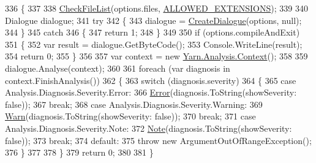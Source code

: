 \begin{DoxyCode}
336         \{
337 
338             \hyperlink{a00185_ad77564b25725a771f0fd4da430582e6f}{CheckFileList}(options.files, \hyperlink{a00185_a0979de7ea02c8c0375b8220a12e6575e}{ALLOWED\_EXTENSIONS});
339 
340             Dialogue dialogue;
341             \textcolor{keywordflow}{try}
342             \{
343                 dialogue = \hyperlink{a00185_aab244361a510cee18ad2f636d110e0d5}{CreateDialogue}(options, null);
344             \}
345             \textcolor{keywordflow}{catch}
346             \{
347                 \textcolor{keywordflow}{return} 1;
348             \}
349 
350             \textcolor{keywordflow}{if} (options.compileAndExit)
351             \{
352                 var result = dialogue.GetByteCode();
353                 Console.WriteLine(result);
354                 \textcolor{keywordflow}{return} 0;
355             \}
356 
357             var context = \textcolor{keyword}{new} \hyperlink{a00047}{Yarn.Analysis.Context}();
358 
359             dialogue.Analyse(context);
360 
361             \textcolor{keywordflow}{foreach} (var diagnosis \textcolor{keywordflow}{in} context.FinishAnalysis())
362             \{
363                 \textcolor{keywordflow}{switch} (diagnosis.severity)
364                 \{
365                     \textcolor{keywordflow}{case} Analysis.Diagnosis.Severity.Error:
366                         \hyperlink{a00185_a2f63f9f5b7634cb50ee75ff2eb18b137}{Error}(diagnosis.ToString(showSeverity: \textcolor{keyword}{false}));
367                         \textcolor{keywordflow}{break};
368                     \textcolor{keywordflow}{case} Analysis.Diagnosis.Severity.Warning:
369                         \hyperlink{a00185_a979bb6f049b6c5294f745a19e24ddd9d}{Warn}(diagnosis.ToString(showSeverity: \textcolor{keyword}{false}));
370                         \textcolor{keywordflow}{break};
371                     \textcolor{keywordflow}{case} Analysis.Diagnosis.Severity.Note:
372                         \hyperlink{a00185_a939cc9e943c574b36c6af93e9c772702}{Note}(diagnosis.ToString(showSeverity: \textcolor{keyword}{false}));
373                         \textcolor{keywordflow}{break};
374                     \textcolor{keywordflow}{default}:
375                         \textcolor{keywordflow}{throw} \textcolor{keyword}{new} ArgumentOutOfRangeException();
376                 \}
377 
378             \}
379             \textcolor{keywordflow}{return} 0;
380 
381         \}
\end{DoxyCode}


